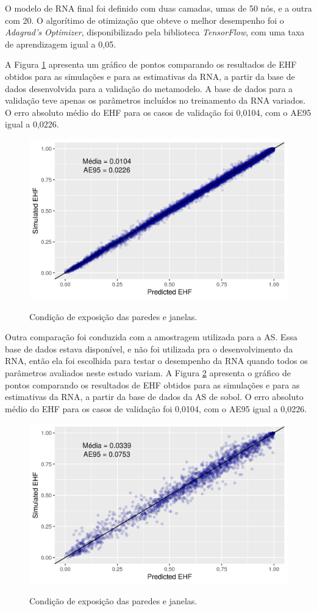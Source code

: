 \documentclass[brazil,hardcopy,openany,a4paper]{ufscthesis}
\begin{document}
	O modelo de RNA final foi definido com duas camadas, umas de 50 nós, e a outra com 20. 
	O algorítimo de otimização que obteve o melhor desempenho foi o \textit{Adagrad's Optimizer}, disponibilizado pela biblioteca \textit{TensorFlow}, com uma taxa de aprendizagem igual a 0,05.
	
	A Figura \ref{fig:ann_validation} apresenta um gráfico de pontos comparando os resultados de EHF obtidos para as simulações e para as estimativas da RNA, a partir da base de dados desenvolvida para a validação do metamodelo. A base de dados para a validação teve apenas os parâmetros incluídos no treinamento da RNA variados. 
	O erro absoluto médio do EHF para os casos de validação foi 0,0104, com o AE95 igual a 0,0226.
	
	\begin{figure}[H]
		\centering
		\caption{Condição de exposição das paredes e janelas.}
		\includegraphics[width=1\linewidth]{img/ann_validation.png}
		\label{fig:ann_validation}
	\end{figure}
	
	Outra comparação foi conduzida com a amostragem utilizada para a AS. Essa base de dados estava disponível, e não foi utilizada pra o desenvolvimento da RNA, então ela foi escolhida para testar o desempenho da RNA quando todos os parâmetros avaliados neste estudo variam. A Figura \ref{fig:ann_sobol} apresenta o gráfico de pontos comparando os resultados de EHF obtidos para as simulações e para as estimativas da RNA, a partir da base de dados da AS de sobol. O erro absoluto médio do EHF para os casos de validação foi 0,0104, com o AE95 igual a 0,0226.
	
	\begin{figure}[H]
		\centering
		\caption{Condição de exposição das paredes e janelas.}
		\includegraphics[width=1\linewidth]{img/ann_test.png}
		\label{fig:ann_sobol}
	\end{figure}
	
	


	
\end{document}
